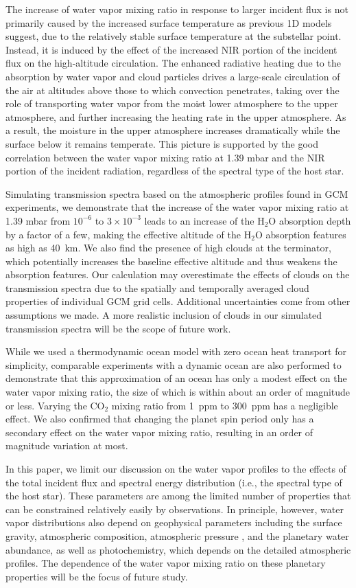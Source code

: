 \documentclass[11pt,numberedappendix,twocolappendix,]{emulateapj}
\def\water{H$_2$O}
\def\preslevel{1.39 mbar}
\def\wv{water vapor}
\begin{document}
The increase of \wv{} mixing ratio in response to larger incident flux is not primarily caused by the increased surface temperature as previous 1D models suggest, due to the relatively stable surface temperature at the substellar point. 
Instead, it is induced by the effect of the increased NIR portion of the incident flux on the high-altitude circulation. 
The enhanced radiative heating due to the absorption by \wv{} and cloud particles drives a large-scale circulation of the air at altitudes above those to which convection penetrates, taking over the role of transporting \wv{} from the moist lower atmosphere to the upper atmosphere, and further increasing the heating rate in the upper atmosphere.
As a result, the moisture in the upper atmosphere increases dramatically while the surface below it remains temperate. 
This picture is supported by the good correlation between the \wv{} mixing ratio at \preslevel{} and the NIR portion of the incident radiation, regardless of the spectral type of the host star. 

Simulating transmission spectra based on the atmospheric profiles found in GCM experiments, 
we demonstrate that the increase of the \wv{} mixing ratio at \preslevel{} from $10^{-6}$ to $3 \times 10^{-3}$ leads to an increase of the \water{} absorption depth by a factor of a few, making the effective altitude of the \water{} absorption features as high as 40~km. 
We also find the presence of high clouds at the terminator, which    potentially increases the baseline effective altitude and thus weakens the absorption features. 
Our calculation may overestimate the effects of clouds on the transmission spectra due to the spatially and temporally averaged cloud properties of individual GCM grid cells.
Additional uncertainties come from other assumptions we made. 
A more realistic inclusion of clouds in our simulated transmission spectra will be the scope of future work. 

While we used a thermodynamic ocean model with zero ocean heat transport for simplicity, comparable experiments with a dynamic ocean are also performed to demonstrate that this approximation of an ocean has only a modest effect on the \wv{} mixing ratio, the size of which is within about an order of magnitude or less. 
Varying the CO$_2$ mixing ratio from 1~ppm to 300~ppm has a negligible effect. 
We also confirmed that changing the planet spin period only has a secondary effect on the \wv{} mixing ratio, resulting in an order of magnitude variation at most. 

In this paper, we limit our discussion on the \wv{} profiles to the effects of the total incident flux and spectral energy distribution (i.e., the spectral type of the host star). 
These parameters are among the limited number of properties that can be constrained relatively easily by observations. 
In principle, however, \wv{} distributions also depend on geophysical parameters including the surface gravity, atmospheric composition, atmospheric pressure \citep[e.g.,][]{Turbet2016}, and the planetary water abundance, as well as photochemistry, which depends on the detailed atmospheric profiles. 
The dependence of the \wv{} mixing ratio on these planetary properties will be  the focus of future study. 
\end{document}
